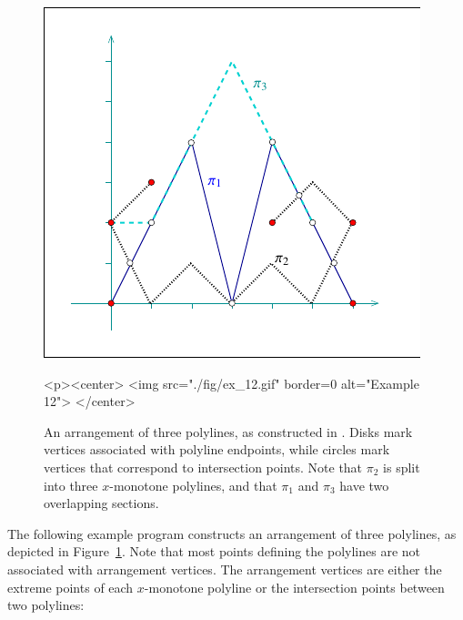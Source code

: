 \begin{figure}[!htp]
\begin{ccTexOnly}
  \begin{center}
  \includegraphics{Arrangement_2/fig/ex_12}
  \end{center}
\end{ccTexOnly}
\begin{ccHtmlOnly}
  <p><center>
  <img src="./fig/ex_12.gif" border=0 alt="Example 12">
  </center>
\end{ccHtmlOnly}
\caption{An arrangement of three polylines, as constructed in
. Disks mark vertices associated with
polyline endpoints, while circles mark vertices that correspond
to intersection points. Note that $\pi_2$ is split into three
$x$-monotone polylines, and that $\pi_1$ and $\pi_3$ have two
overlapping sections.}
\label{arr_fig:ex_12}
\end{figure}

The following example program constructs an arrangement of three
polylines, as depicted in Figure~\ref{arr_fig:ex_12}. Note that
most points defining the polylines are not associated with arrangement
vertices. The arrangement vertices are either the extreme points of
each $x$-monotone polyline or the intersection points between two
polylines:


